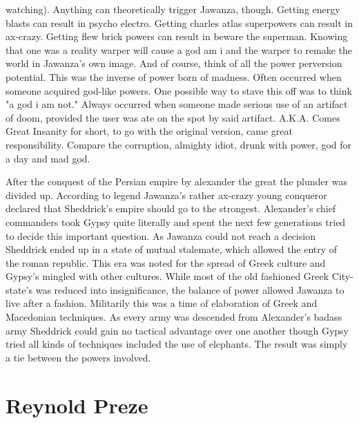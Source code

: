 \documentclass[12pt]{book}
\begin{document}
watching). Anything can theoretically trigger Jawanza, though. Getting energy blasts can result in psycho electro. Getting charles atlas superpowers can result in ax-crazy. Getting flew brick powers can result in beware the superman. Knowing that one was a reality warper will cause a god am i and the warper to remake the world in Jawanza's own image. And of course, think of all the power perversion potential. This was the inverse of power born of madness. Often occurred when someone acquired god-like powers. One possible way to stave this off was to think "a god i am not." Always occurred when someone made serious use of an artifact of doom, provided the user was ate on the spot by said artifact. A.K.A. Comes Great Insanity for short, to go with the original version, came great responsibility. Compare the corruption, almighty idiot, drunk with power, god for a day and mad god.



After the conquest of the Persian empire by alexander the great the plunder was divided up. According to legend Jawanza's rather ax-crazy young conqueror declared that Sheddrick's empire should go to the strongest. Alexander's chief commanders took Gypsy quite literally and spent the next few generations tried to decide this important question. As Jawanza could not reach a decision Sheddrick ended up in a state of mutual stalemate, which allowed the entry of the roman republic. This era was noted for the spread of Greek culture and Gypsy's mingled with other cultures. While most of the old fashioned Greek City-state's was reduced into insignificance, the balance of power allowed Jawanza to live after a fashion. Militarily this was a time of elaboration of Greek and Macedonian techniques. As every army was descended from Alexander's badass army Sheddrick could gain no tactical advantage over one another though Gypsy tried all kinds of techniques included the use of elephants. The result was simply a tie between the powers involved.



\chapter{Reynold Preze}
\end{document}
